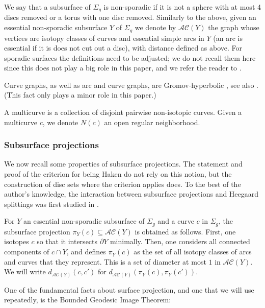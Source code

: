 \documentclass[11pt, oneside]{amsart}
\theoremstyle{definition}
\theoremstyle{definition}
\begin{document}
We say that a subsurface of $\Sigma_g$ is non-sporadic if it is not a sphere with at most 4 discs removed or a torus with one disc removed. Similarly to the above, given an essential non-sporadic subsurface $Y$ of $\Sigma_g$ we denote by $\mathcal{AC}(Y)$ the graph whose vertices are isotopy classes of curves and essential simple arcs in $Y$ (an arc is essential if it is does not cut out a disc), with distance defined as above. For sporadic surfaces the definitions need to be adjusted; we do not recall them here since this does not play a big role in this paper, and we refer the reader to \cite{MasurMinsky:I}.

Curve graphs, as well as arc and curve graphs, are Gromov-hyperbolic \cite{MasurMinsky:I}, see also \cite{Aougab:uniform,Bowditch:uniform,ClayRafiSchleimer:uniform,HenselPrzytyckiWebb:unicorn,PrzytyckiSisto:universe}. (This fact only plays a minor role in this paper.)

A multicurve is a collection of disjoint pairwise non-isotopic curves. Given a multicurve $c$, we denote $N(c)$ an open regular neighborhood.

\subsubsection{Subsurface projections} We now recall some properties of subsurface projections. The statement and proof of the criterion for being Haken do not rely on this notion, but the construction of disc sets where the criterion applies does. To the best of the author's knowledge, the interaction between subsurface projections and Heegaard splittings was first studied in \cite{JMM:subsurface_proj_Heegard}.

For $Y$ an essential non-sporadic subsurface of $\Sigma_g$ and a curve $c$ in $\Sigma_g$, the subsurface projection $\pi_Y(c)\subseteq \mathcal{AC}(Y)$ is obtained as follows. First, one isotopes $c$ so that it intersects $\partial Y$ minimally. Then, one considers all connected components of $c\cap Y$, and defines $\pi_Y(c)$ as the set of all isotopy classes of arcs and curves that they represent. This is a set of diameter at most $1$ in $\mathcal{AC}(Y)$. We will write $d_{\mathcal{AC}(Y)}(c,c')$ for $d_{\mathcal{AC}(Y)}(\pi_Y(c),\pi_Y(c'))$.

One of the fundamental facts about surface projection, and one that we will use repeatedly, is the Bounded Geodesic Image Theorem:
\end{document}
